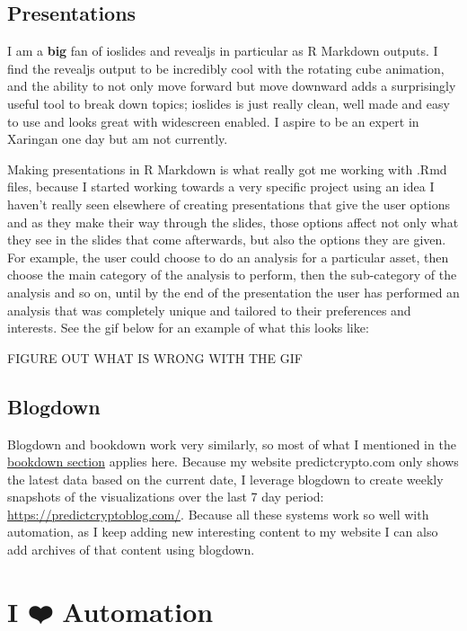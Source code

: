 \documentclass[
]{book}
\begin{document}
\hypertarget{presentations}{%
\subsection{Presentations}\label{presentations}}

I am a \textbf{big} fan of ioslides and revealjs in particular as R Markdown outputs. I find the revealjs output to be incredibly cool with the rotating cube animation, and the ability to not only move forward but move downward adds a surprisingly useful tool to break down topics; ioslides is just really clean, well made and easy to use and looks great with widescreen enabled. I aspire to be an expert in Xaringan one day but am not currently.

Making presentations in R Markdown is what really got me working with .Rmd files, because I started working towards a very specific project using an idea I haven't really seen elsewhere of creating presentations that give the user options and as they make their way through the slides, those options affect not only what they see in the slides that come afterwards, but also the options they are given. For example, the user could choose to do an analysis for a particular asset, then choose the main category of the analysis to perform, then the sub-category of the analysis and so on, until by the end of the presentation the user has performed an analysis that was completely unique and tailored to their preferences and interests. See the gif below for an example of what this looks like:

FIGURE OUT WHAT IS WRONG WITH THE GIF

\hypertarget{blogdown}{%
\subsection{Blogdown}\label{blogdown}}

Blogdown\citep{R-blogdown} and bookdown work very similarly, so most of what I mentioned in the \protect\hyperlink{bookdown}{bookdown section} applies here. Because my website predictcrypto.com only shows the latest data based on the current date, I leverage blogdown to create weekly snapshots of the visualizations over the last 7 day period: \url{https://predictcryptoblog.com/}. Because all these systems work so well with automation, as I keep adding new interesting content to my website I can also add archives of that content using blogdown.

\hypertarget{automation}{%
\section{I ❤️ Automation}\label{automation}}
\end{document}
